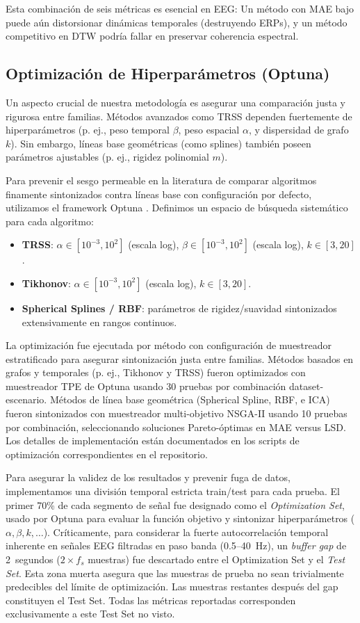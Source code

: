 Esta combinación de seis métricas es esencial en EEG: Un método con MAE bajo puede aún distorsionar dinámicas temporales (destruyendo ERPs), y un método competitivo en DTW podría fallar en preservar coherencia espectral.

\subsection{Optimización de Hiperparámetros (Optuna)}

Un aspecto crucial de nuestra metodología es asegurar una comparación justa y rigurosa entre familias. Métodos avanzados como TRSS dependen fuertemente de hiperparámetros (p. ej., peso temporal $\beta$, peso espacial $\alpha$, y dispersidad de grafo $k$). Sin embargo, líneas base geométricas (como splines) también poseen parámetros ajustables (p. ej., rigidez polinomial $m$).

Para prevenir el sesgo permeable en la literatura de comparar algoritmos finamente sintonizados contra líneas base con configuración por defecto, utilizamos el framework Optuna \cite{akiba2019optuna}. Definimos un espacio de búsqueda sistemático para cada algoritmo:
\begin{itemize}
\item \textbf{TRSS}: $\alpha \in [10^{-3}, 10^{2}]$ (escala log), $\beta \in [10^{-3}, 10^{2}]$ (escala log), $k \in [3, 20]$.
\item \textbf{Tikhonov}: $\alpha \in [10^{-3}, 10^{2}]$ (escala log), $k \in [3, 20]$.
\item \textbf{Spherical Splines / RBF}: parámetros de rigidez/suavidad sintonizados extensivamente en rangos continuos.
\end{itemize}
La optimización fue ejecutada por método con configuración de muestreador estratificado para asegurar sintonización justa entre familias. Métodos basados en grafos y temporales (p. ej., Tikhonov y TRSS) fueron optimizados con muestreador TPE de Optuna usando 30 pruebas por combinación dataset-escenario. Métodos de línea base geométrica (Spherical Spline, RBF, e ICA) fueron sintonizados con muestreador multi-objetivo NSGA-II usando 10 pruebas por combinación, seleccionando soluciones Pareto-óptimas en MAE versus LSD. Los detalles de implementación están documentados en los scripts de optimización correspondientes en el repositorio.

Para asegurar la validez de los resultados y prevenir fuga de datos, implementamos una división temporal estricta train/test para cada prueba. El primer 70\% de cada segmento de señal fue designado como el \emph{Optimization Set}, usado por Optuna para evaluar la función objetivo y sintonizar hiperparámetros ($\alpha, \beta, k, \dots$). Críticamente, para considerar la fuerte autocorrelación temporal inherente en señales EEG filtradas en paso banda (0.5--40~Hz), un \emph{buffer gap} de 2~segundos ($2 \times f_s$ muestras) fue descartado entre el Optimization Set y el \emph{Test Set}. Esta zona muerta asegura que las muestras de prueba no sean trivialmente predecibles del límite de optimización. Las muestras restantes después del gap constituyen el Test Set. Todas las métricas reportadas corresponden exclusivamente a este Test Set no visto.


